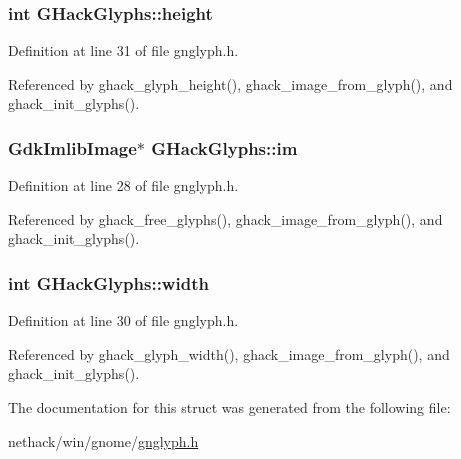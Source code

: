 \hypertarget{structGHackGlyphs_a9cc7dbd7dc3fcca515ea36710138f589}{
\subsubsection[{height}]{\setlength{\rightskip}{0pt plus 5cm}int G\+Hack\+Glyphs\+::height}}\label{structGHackGlyphs_a9cc7dbd7dc3fcca515ea36710138f589}


Definition at line 31 of file gnglyph.\+h.



Referenced by ghack\+\_\+glyph\+\_\+height(), ghack\+\_\+image\+\_\+from\+\_\+glyph(), and ghack\+\_\+init\+\_\+glyphs().

\hypertarget{structGHackGlyphs_ad7cd303d094a7ba56caedb3b2b661298}{
\subsubsection[{im}]{\setlength{\rightskip}{0pt plus 5cm}Gdk\+Imlib\+Image$\ast$ G\+Hack\+Glyphs\+::im}}\label{structGHackGlyphs_ad7cd303d094a7ba56caedb3b2b661298}


Definition at line 28 of file gnglyph.\+h.



Referenced by ghack\+\_\+free\+\_\+glyphs(), ghack\+\_\+image\+\_\+from\+\_\+glyph(), and ghack\+\_\+init\+\_\+glyphs().

\hypertarget{structGHackGlyphs_a11710785ad9c133b74873d467215c793}{
\subsubsection[{width}]{\setlength{\rightskip}{0pt plus 5cm}int G\+Hack\+Glyphs\+::width}}\label{structGHackGlyphs_a11710785ad9c133b74873d467215c793}


Definition at line 30 of file gnglyph.\+h.



Referenced by ghack\+\_\+glyph\+\_\+width(), ghack\+\_\+image\+\_\+from\+\_\+glyph(), and ghack\+\_\+init\+\_\+glyphs().



The documentation for this struct was generated from the following file\+:\begin{DoxyCompactItemize}
\item 
nethack/win/gnome/\hyperlink{gnglyph_8h}{gnglyph.\+h}\end{DoxyCompactItemize}
